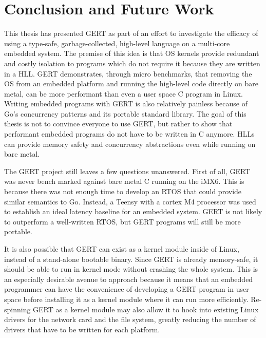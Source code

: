\chapter{Conclusion and Future Work}

This thesis has presented GERT as part of an effort to investigate the efficacy of using
a type-safe, garbage-collected, high-level language on a multi-core embedded system. The premise
of this idea is that OS kernels provide redundant and costly isolation to programs which
do not require it because they are written in a HLL. GERT demonstrates, through micro benchmarks,
that removing the OS
from an embedded platform and running the high-level code directly on bare metal, can be
more performant than even a user space C program in Linux. Writing embedded programs with GERT
is also relatively painless because of Go's concurrency patterns and its portable standard library.
The goal of this thesis is not to convince everyone to use GERT, but rather to show that performant
embedded programs do not have to be written in C anymore. HLLs can provide memory safety and concurrency abstractions
even while running on bare metal.

The GERT project still leaves a few questions unanswered. First of all, GERT was
never bench marked against bare metal C running on the iMX6. This is because there was not enough time to develop an
RTOS that could provide similar semantics to Go. Instead, a Teensy with a cortex M4 processor was used
to establish an ideal latency baseline for an embedded system. GERT is not likely to outperform a well-written
RTOS, but GERT programs will still be more portable.

It is also possible that GERT can exist as
a kernel module inside of Linux, instead of a stand-alone bootable binary. Since GERT is already
memory-safe, it should be able to run in kernel mode without crashing the whole system. This is
an especially desirable avenue to approach because it means that an embedded programmer can have
the convenience of developing a GERT program in user space before installing it as a kernel
module where it can run more efficiently. Re-spinning GERT as a kernel module may also
allow it to hook into existing Linux drivers for the network card and the file system, greatly reducing
the number of drivers that have to be written for each platform.
